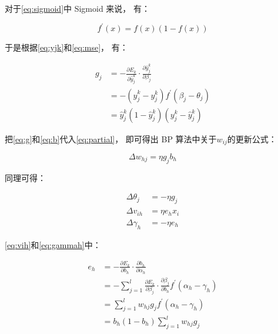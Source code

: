 对于\cref{eq:sigmoid}中 Sigmoid 来说，
有：

\begin{equation}
    f^{\prime}\left(x\right) = f\left(x\right)\left(1-f\left(x\right)\right)
\end{equation}

于是根据\cref{eq:yjk}和\cref{eq:mse}，
有：

\begin{equation}
    \label{eq:g}
    \begin{aligned}
        g _ { j } & = - \frac { \partial E _ { k } } { \partial \hat { y } _ { j } ^ { k } } \cdot \frac { \partial \hat { y } _ { j } ^ { k } } { \partial \beta _ { j } } \\
                  & = - ( \hat { y } _ { j } ^ { k } - y _ { j } ^ { k } ) f ^ { \prime } ( \beta _ { j } - \theta _ { j } )                                                \\
                  & = \hat { y } _ { j } ^ { k } ( 1 - \hat { y } _ { j } ^ { k } ) ( y _ { j } ^ { k } - \hat { y } _ { j } ^ { k } )
    \end{aligned}
\end{equation}

把\cref{eq:g}和\cref{eq:b}代入\cref{eq:partial}，
即可得出 BP 算法中关于$w_{ij}$的更新公式：

\begin{equation}
    \label{eq:whj}
    \Delta w_{hj} = \eta g_j b_h
\end{equation}

同理可得：

\begin{align}
    \Delta\theta_j                   & = -\eta g_j   \\
    \label{eq:vih}\Delta v_{ih}      & = \eta e_h x_i \\
    \label{eq:gammah}\Delta \gamma_h & = -\eta e_h
\end{align}

\cref{eq:vih}和\cref{eq:gammah}中：

\begin{equation}
    \label{eq:e}
    \begin{aligned}
        e _ { h } & = - \frac { \partial E _ { k } } { \partial b _ { h } } \cdot \frac { \partial b _ { h } } { \partial \alpha _ { h } }                                                                                \\
                  & = - \sum _ { j = 1 } ^ { l } \frac { \partial E _ { k } } { \partial \beta _ { j } } \cdot \frac { \partial \beta _ { j } } { \partial b _ { h } } f ^ { \prime } ( \alpha _ { h } - \gamma _ { h } ) \\
                  & = \sum _ { j = 1 } ^ { l } w _ { h j } g _ { j } f ^ { \prime } ( \alpha _ { h } - \gamma _ { h } )                                                                                                   \\
                  & = b _ { h } ( 1 - b _ { h } ) \sum _ { j = 1 } ^ { l } w _ { h j } g _ { j }
    \end{aligned}
\end{equation}

